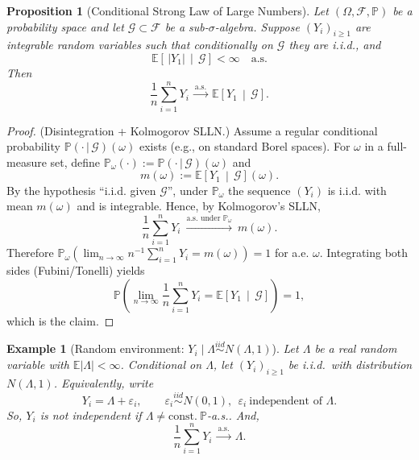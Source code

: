 \documentclass[12pt]{article}
\renewcommand{\(}{\left(}%
\renewcommand{\)}{\right)}%
\renewcommand{\[}{\left[}%
\renewcommand{\]}{\right]}%
\newcommand{\p}{\mathbb{P}}
\newtheorem{example}{Example}[section]}
\newtheorem{proposition}{Proposition}[section]}
\newtheorem{proof}{Proof.}}
\begin{document}
\begin{proposition}[Conditional Strong Law of Large Numbers]
Let $(\Omega,\mathcal F,\mathbb P)$ be a probability space and let $\mathcal G\subset\mathcal F$ be a sub-$\sigma$-algebra.
Suppose $(Y_i)_{i\ge1}$ are integrable random variables such that \emph{conditionally on $\mathcal G$} they are i.i.d., and
\begin{equation*}
\mathbb E\left[\,|Y_1|\,\middle|\,\mathcal G\right]<\infty\quad\mathrm{a.s.}
\end{equation*}
Then
\begin{equation*}
\frac{1}{n}\sum_{i=1}^n Y_i \ \xrightarrow{\mathrm{a.s.}}\ \mathbb E\left[Y_1\,\middle|\,\mathcal G\right].
\end{equation*}
\end{proposition}

\begin{proof}
(Disintegration + Kolmogorov SLLN.) Assume a regular conditional probability $\mathbb P(\cdot\,|\,\mathcal G)(\omega)$ exists (e.g., on standard Borel spaces).
For $\omega$ in a full-measure set, define $\mathbb P_\omega(\cdot):=\mathbb P(\cdot\,|\,\mathcal G)(\omega)$ and
\begin{equation*}
m(\omega):=\mathbb E\left[Y_1\,\middle|\,\mathcal G\right](\omega).
\end{equation*}
By the hypothesis ``i.i.d. given $\mathcal G$'', under $\mathbb P_\omega$ the sequence $(Y_i)$ is i.i.d. with mean $m(\omega)$ and is integrable.
Hence, by Kolmogorov's SLLN,
\begin{equation*}
\frac{1}{n}\sum_{i=1}^n Y_i \ \xrightarrow{\text{a.s. under }\mathbb P_\omega}\ m(\omega).
\end{equation*}
Therefore $\mathbb P_\omega\!\left(\lim_{n\to\infty} n^{-1}\sum_{i=1}^n Y_i=m(\omega)\right)=1$ for a.e. $\omega$.
Integrating both sides (Fubini/Tonelli) yields
\begin{equation*}
\mathbb P\!\left(\lim_{n\to\infty}\frac{1}{n}\sum_{i=1}^n Y_i=\mathbb E\left[Y_1\,\middle|\,\mathcal G\right]\right)=1,
\end{equation*}
which is the claim.
\end{proof}


\begin{example}[Random environment: $Y_i\mid \Lambda \stackrel{iid}{\sim}N(\Lambda,1)$]
Let $\Lambda$ be a real random variable with $\mathbb E|\Lambda|<\infty$.
Conditional on $\Lambda$, let $(Y_i)_{i\ge1}$ be i.i.d.\ with distribution $N(\Lambda,1)$.
Equivalently, write
\begin{equation*}
Y_i=\Lambda+\varepsilon_i,\qquad \varepsilon_i\stackrel{iid}{\sim}N(0,1),\ \ \varepsilon_i\ \text{independent of }\Lambda.
\end{equation*}
So, $Y_i$ is not independent if $\Lambda\neq \mathrm{const.}\ \p$-a.s.. And, 
\begin{equation*}
\frac{1}{n}\sum_{i=1}^n Y_i \ \xrightarrow{\mathrm{a.s.}}\ \Lambda .
\end{equation*}
\end{example}
\end{document}
